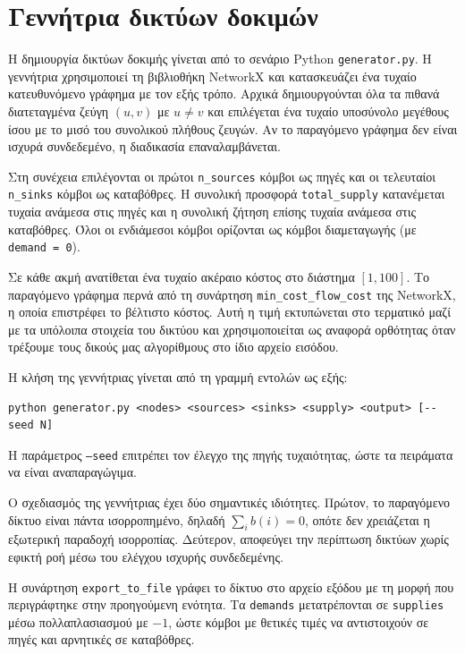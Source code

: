 \documentclass[11pt,a4paper,oneside]{report}
\begin{document}
\section{Γεννήτρια δικτύων δοκιμών}

Η δημιουργία δικτύων δοκιμής γίνεται από το σενάριο \textenglish{Python} \texttt{generator.py}. Η γεννήτρια χρησιμοποιεί τη βιβλιοθήκη \textenglish{NetworkX} και κατασκευάζει ένα τυχαίο κατευθυνόμενο γράφημα με τον εξής τρόπο. Αρχικά δημιουργούνται όλα τα πιθανά διατεταγμένα ζεύγη $(u,v)$ με $u \neq v$ και επιλέγεται ένα τυχαίο υποσύνολο μεγέθους ίσου με το μισό του συνολικού πλήθους ζευγών. Αν το παραγόμενο γράφημα δεν είναι ισχυρά συνδεδεμένο, η διαδικασία επαναλαμβάνεται.

Στη συνέχεια επιλέγονται οι πρώτοι \texttt{n\_sources} κόμβοι ως πηγές και οι τελευταίοι \texttt{n\_sinks} κόμβοι ως καταβόθρες. Η συνολική προσφορά \texttt{total\_supply} κατανέμεται τυχαία ανάμεσα στις πηγές και η συνολική ζήτηση επίσης τυχαία ανάμεσα στις καταβόθρες. Όλοι οι ενδιάμεσοι κόμβοι ορίζονται ως κόμβοι διαμεταγωγής (με \texttt{demand = 0}).

Σε κάθε ακμή ανατίθεται ένα τυχαίο ακέραιο κόστος στο διάστημα $[1, 100]$. Το παραγόμενο γράφημα περνά από τη συνάρτηση \texttt{min\_cost\_flow\_cost} της \textenglish{NetworkX}, η οποία επιστρέφει το βέλτιστο κόστος. Αυτή η τιμή εκτυπώνεται στο τερματικό μαζί με τα υπόλοιπα στοιχεία του δικτύου και χρησιμοποιείται ως αναφορά ορθότητας όταν τρέξουμε τους δικούς μας αλγορίθμους στο ίδιο αρχείο εισόδου.

Η κλήση της γεννήτριας γίνεται από τη γραμμή εντολών ως εξής:

\begin{verbatim}
python generator.py <nodes> <sources> <sinks> <supply> <output> [--seed N]
\end{verbatim}

Η παράμετρος \texttt{--seed} επιτρέπει τον έλεγχο της πηγής τυχαιότητας, ώστε τα πειράματα να είναι αναπαραγώγιμα.

Ο σχεδιασμός της γεννήτριας έχει δύο σημαντικές ιδιότητες. Πρώτον, το παραγόμενο δίκτυο είναι πάντα ισορροπημένο, δηλαδή $\sum_i b(i) = 0$, οπότε δεν χρειάζεται η εξωτερική παραδοχή ισορροπίας. Δεύτερον, αποφεύγει την περίπτωση δικτύων χωρίς εφικτή ροή μέσω του ελέγχου ισχυρής συνδεδεμένης.

Η συνάρτηση \texttt{export\_to\_file} γράφει το δίκτυο στο αρχείο εξόδου με τη μορφή που περιγράφτηκε στην προηγούμενη ενότητα. Τα \texttt{demands} μετατρέπονται σε \texttt{supplies} μέσω πολλαπλασιασμού με $-1$, ώστε κόμβοι με θετικές τιμές να αντιστοιχούν σε πηγές και αρνητικές σε καταβόθρες.
\end{document}
